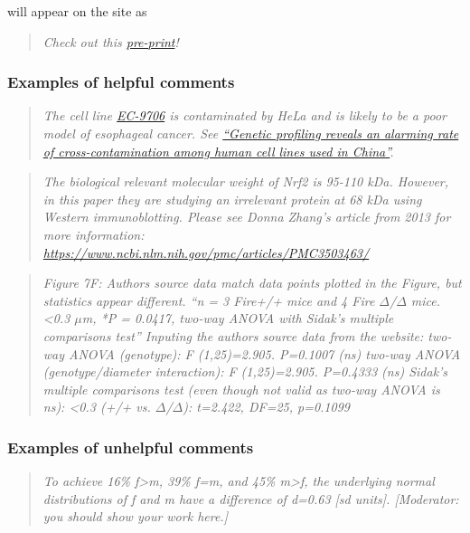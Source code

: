 \documentclass[letterpaper, 12pt]{article}
\begin{document}
will appear on the site as

\begin{quote}
    \textit{Check out this \href{https://doi.org/10.48550/arXiv.2107.06751}{pre-print}!}
\end{quote}

\subsubsection*{Examples of helpful comments}

\begin{quote}
    \textit{The cell line \href{https://www.cellosaurus.org/CVCL_E307}{EC-9706} is contaminated by HeLa and is likely to be a poor model of esophageal cancer. See \href{https://faseb.onlinelibrary.wiley.com/doi/abs/10.1096/fj.14-266718}{``Genetic profiling reveals an alarming rate of cross-contamination among human cell lines used in China''}.}
\end{quote}

\begin{quote}
    \textit{The biological relevant molecular weight of Nrf2 is 95-110 kDa. However, in this paper they are studying an irrelevant protein at 68 kDa using Western immunoblotting. Please see Donna Zhang's article from 2013 for more information: \href{https://www.ncbi.nlm.nih.gov/pmc/articles/PMC3503463/}{https://www.ncbi.nlm.nih.gov/pmc/articles/PMC3503463/}}
\end{quote}

\begin{quote}
    \textit{
    Figure 7F: Authors source data match data points plotted in the Figure, but statistics appear different. “n = 3 Fire+/+ mice and 4 Fire $\Delta$/$\Delta$ mice. <0.3 $\mu$m, *P = 0.0417, two-way ANOVA with Sidak’s multiple comparisons test” Inputing the authors source data from the website: two-way ANOVA (genotype): F (1,25)=2.905. P=0.1007 (ns) two-way ANOVA (genotype/diameter interaction): F (1,25)=2.905. P=0.4333 (ns) Sidak’s multiple comparisons test (even though not valid as two-way ANOVA is ns): <0.3 (+/+ vs. $\Delta$/$\Delta$): t=2.422, DF=25, p=0.1099
}
\end{quote}

\subsubsection*{Examples of unhelpful comments}

\begin{quote}
    \textit{To achieve 16\% f>m, 39\% f=m, and 45\% m>f, the underlying normal distributions of f and m have a difference of d=0.63 [sd units]. [Moderator: you should show your work here.]}
\end{quote}
\end{document}
